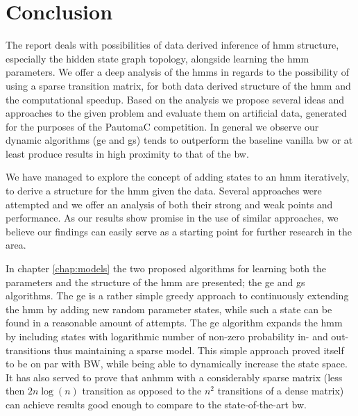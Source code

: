 \chapter{Conclusion}
\label{chap:conclusion}
The report deals with possibilities of data derived inference of \gls{hmm} structure, especially the hidden state graph topology, alongside learning the \gls{hmm} parameters. We offer a deep analysis of the \glspl{hmm} in regards to the possibility of using a sparse transition matrix, for both data derived structure of the \gls{hmm} and the computational  speedup. Based on the analysis we propose several ideas and approaches to the given problem and evaluate them on artificial data, generated for the purposes of the PautomaC competition. In general we observe our dynamic algorithms (\acrfull{ge} and \acrfull{gs}) tends to outperform the baseline vanilla \gls{bw} or at least produce results in high proximity to that of the \gls{bw}.

We have managed to explore the concept of adding states to an \gls{hmm} iteratively, to derive a structure for the \gls{hmm} given the data. Several approaches were attempted and we offer an analysis of both their strong and weak points and performance. As our results show promise in the use of similar approaches, we believe our findings can easily serve as a starting point for further research in the area.

In chapter \ref{chap:models} the two proposed algorithms for learning both the parameters and the structure of the \gls{hmm} are presented; the \acrlong{ge} and \acrlong{gs} algorithms. The \gls{ge} is a rather simple greedy approach to continuously extending the \gls{hmm} by adding new random parameter states, while such a state can be found in a reasonable amount of attempts. The \gls{ge} algorithm expands the \gls{hmm} by including states with logarithmic number of non-zero probability in- and out-transitions thus maintaining a sparse model. This simple approach proved itself to be on par with BW, while being able to dynamically increase the state space. It has also served to prove that an\gls{hmm} with a considerably sparse matrix (less then $2n\log(n)$ transition as opposed to the $n^2$ transitions of a dense matrix) can achieve results good enough to compare to the state-of-the-art \gls{bw}.


